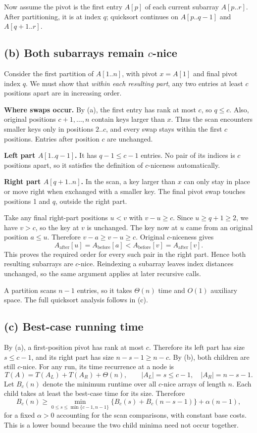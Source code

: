 \documentclass[11pt,a4paper]{article}
\newcommand{\parttitle}[1]{\Needspace{10\baselineskip}\subsection*{#1}}
\begin{document}
Now assume the pivot is the first entry $A[p]$ of each current subarray $A[p..r]$. After partitioning, it is at index $q$; quicksort continues on $A[p..q-1]$ and $A[q+1..r]$. 

\parttitle{(b) Both subarrays remain $c$-nice}
Consider the first partition of $A[1..n]$, with pivot $x=A[1]$ and final pivot index $q$. We must show that \emph{within each resulting part}, any two entries at least $c$ positions apart are in increasing order.

\textbf{Where swaps occur.} By (a), the first entry has rank at most $c$, so $q\le c$. Also, original positions $c+1,\ldots,n$ contain keys larger than $x$. Thus the scan encounters smaller keys only in positions $2..c$, and every swap stays within the first $c$ positions. Entries after position $c$ are unchanged.

\textbf{Left part $A[1..q-1]$.} It has $q-1\le c-1$ entries. No pair of its indices is $c$ positions apart, so it satisfies the definition of $c$-niceness automatically.

\textbf{Right part $A[q+1..n]$.} In the scan, a key larger than $x$ can only stay in place or move right when exchanged with a smaller key. The final pivot swap touches positions 1 and $q$, outside the right part.

Take any final right-part positions $u<v$ with $v-u\ge c$. Since $u\ge q+1\ge2$, we have $v>c$, so the key at $v$ is unchanged. The key now at $u$ came from an original position $a\le u$. Therefore $v-a\ge v-u\ge c$. Original $c$-niceness gives
\[
A_{\mathrm{after}}[u]=A_{\mathrm{before}}[a]
<A_{\mathrm{before}}[v]=A_{\mathrm{after}}[v].
\]
This proves the required order for every such pair in the right part. Hence both resulting subarrays are $c$-nice. Reindexing a subarray leaves index distances unchanged, so the same argument applies at later recursive calls.

A partition scans $n-1$ entries, so it takes $\Theta(n)$ time and $O(1)$ auxiliary space. The full quicksort analysis follows in (c).

\parttitle{(c) Best-case running time}
By (a), a first-position pivot has rank at most $c$. Therefore its left part has size $s\le c-1$, and its right part has size $n-s-1\ge n-c$. By (b), both children are still $c$-nice. For any run, its time recurrence at a node is
\[
T(A)=T(A_L)+T(A_R)+\Theta(n),
\qquad |A_L|=s\le c-1,\quad |A_R|=n-s-1.
\]
Let $B_c(n)$ denote the minimum runtime over all $c$-nice arrays of length $n$. Each child takes at least the best-case time for its size. Therefore
\[
B_c(n)\ge
\min_{0\le s\le\min\{c-1,n-1\}}
\{B_c(s)+B_c(n-s-1)\}+\alpha(n-1),
\]
for a fixed $\alpha>0$ accounting for the scan comparisons, with constant base costs. This is a lower bound because the two child minima need not occur together.
\end{document}
